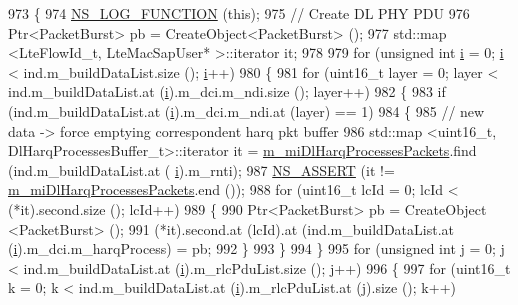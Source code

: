 \begin{DoxyCode}
973 \{
974   \hyperlink{log-macros-disabled_8h_a90b90d5bad1f39cb1b64923ea94c0761}{NS\_LOG\_FUNCTION} (\textcolor{keyword}{this});
975   \textcolor{comment}{// Create DL PHY PDU}
976   Ptr<PacketBurst> pb = CreateObject<PacketBurst> ();
977   std::map <LteFlowId\_t, LteMacSapUser* >::iterator it;
978 
979   \textcolor{keywordflow}{for} (\textcolor{keywordtype}{unsigned} \textcolor{keywordtype}{int} \hyperlink{bernuolliDistribution_8m_a6f6ccfcf58b31cb6412107d9d5281426}{i} = 0; \hyperlink{bernuolliDistribution_8m_a6f6ccfcf58b31cb6412107d9d5281426}{i} < ind.m\_buildDataList.size (); \hyperlink{bernuolliDistribution_8m_a6f6ccfcf58b31cb6412107d9d5281426}{i}++)
980     \{
981       \textcolor{keywordflow}{for} (uint16\_t layer = 0; layer < ind.m\_buildDataList.at (\hyperlink{bernuolliDistribution_8m_a6f6ccfcf58b31cb6412107d9d5281426}{i}).m\_dci.m\_ndi.size (); layer++)
982         \{
983           \textcolor{keywordflow}{if} (ind.m\_buildDataList.at (\hyperlink{bernuolliDistribution_8m_a6f6ccfcf58b31cb6412107d9d5281426}{i}).m\_dci.m\_ndi.at (layer) == 1)
984             \{
985               \textcolor{comment}{// new data -> force emptying correspondent harq pkt buffer}
986               std::map <uint16\_t, DlHarqProcessesBuffer\_t>::iterator it = 
      \hyperlink{classns3_1_1LteEnbMac_aaf60e2fb6f8326eeebbdec6b7e7054da}{m\_miDlHarqProcessesPackets}.find (ind.m\_buildDataList.at (
      \hyperlink{bernuolliDistribution_8m_a6f6ccfcf58b31cb6412107d9d5281426}{i}).m\_rnti);
987               \hyperlink{assert_8h_a6dccdb0de9b252f60088ce281c49d052}{NS\_ASSERT} (it != \hyperlink{classns3_1_1LteEnbMac_aaf60e2fb6f8326eeebbdec6b7e7054da}{m\_miDlHarqProcessesPackets}.end ());
988               \textcolor{keywordflow}{for} (uint16\_t lcId = 0; lcId < (*it).second.size (); lcId++)
989                 \{
990                   Ptr<PacketBurst> pb = CreateObject <PacketBurst> ();
991                   (*it).second.at (lcId).at (ind.m\_buildDataList.at (\hyperlink{bernuolliDistribution_8m_a6f6ccfcf58b31cb6412107d9d5281426}{i}).m\_dci.m\_harqProcess) = pb;
992                 \}
993             \}
994         \}
995       \textcolor{keywordflow}{for} (\textcolor{keywordtype}{unsigned} \textcolor{keywordtype}{int} j = 0; j < ind.m\_buildDataList.at (\hyperlink{bernuolliDistribution_8m_a6f6ccfcf58b31cb6412107d9d5281426}{i}).m\_rlcPduList.size (); j++)
996         \{
997           \textcolor{keywordflow}{for} (uint16\_t k = 0; k < ind.m\_buildDataList.at (\hyperlink{bernuolliDistribution_8m_a6f6ccfcf58b31cb6412107d9d5281426}{i}).m\_rlcPduList.at (j).size (); k++)

\end{DoxyCode}
